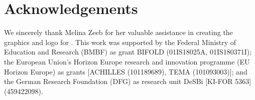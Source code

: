 \section*{Acknowledgements}
We sincerely thank Melina Zeeb for her valuable assistance in creating the graphics and logo for {\ours}. This work was supported by the Federal Ministry of Education and Research (BMBF) as grant BIFOLD (01IS18025A, 01IS180371I); the European Union’s Horizon Europe research and innovation programme (EU Horizon Europe) as grants [ACHILLES (101189689), TEMA (101093003)]; and the German Research Foundation (DFG) as research unit DeSBi [KI-FOR 5363] (459422098).